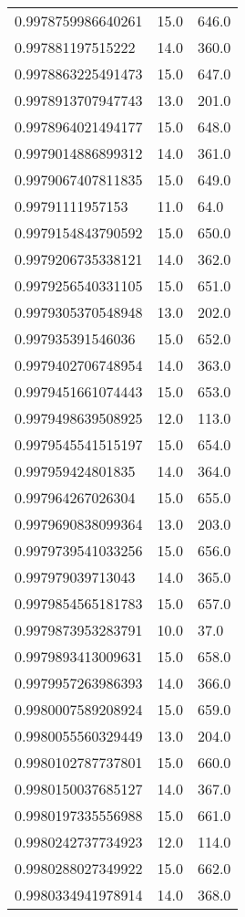 \begin{center}
\begin{supertabular}[H]{p{0.30\textwidth}p{0.05\textwidth}p{0.05\textwidth}}
0.9978759986640261 & 15.0 & 646.0 \\ 
0.997881197515222 & 14.0 & 360.0 \\ 
0.9978863225491473 & 15.0 & 647.0 \\ 
0.9978913707947743 & 13.0 & 201.0 \\ 
0.9978964021494177 & 15.0 & 648.0 \\ 
0.9979014886899312 & 14.0 & 361.0 \\ 
0.9979067407811835 & 15.0 & 649.0 \\ 
0.99791111957153 & 11.0 & 64.0 \\ 
0.9979154843790592 & 15.0 & 650.0 \\ 
0.9979206735338121 & 14.0 & 362.0 \\ 
0.9979256540331105 & 15.0 & 651.0 \\ 
0.9979305370548948 & 13.0 & 202.0 \\ 
0.997935391546036 & 15.0 & 652.0 \\ 
0.9979402706748954 & 14.0 & 363.0 \\ 
0.9979451661074443 & 15.0 & 653.0 \\ 
0.9979498639508925 & 12.0 & 113.0 \\ 
0.9979545541515197 & 15.0 & 654.0 \\ 
0.997959424801835 & 14.0 & 364.0 \\ 
0.997964267026304 & 15.0 & 655.0 \\ 
0.9979690838099364 & 13.0 & 203.0 \\ 
0.9979739541033256 & 15.0 & 656.0 \\ 
0.997979039713043 & 14.0 & 365.0 \\ 
0.9979854565181783 & 15.0 & 657.0 \\ 
0.9979873953283791 & 10.0 & 37.0 \\ 
0.9979893413009631 & 15.0 & 658.0 \\ 
0.9979957263986393 & 14.0 & 366.0 \\ 
0.9980007589208924 & 15.0 & 659.0 \\ 
0.9980055560329449 & 13.0 & 204.0 \\ 
0.9980102787737801 & 15.0 & 660.0 \\ 
0.9980150037685127 & 14.0 & 367.0 \\ 
0.9980197335556988 & 15.0 & 661.0 \\ 
0.9980242737734923 & 12.0 & 114.0 \\ 
0.9980288027349922 & 15.0 & 662.0 \\ 
0.9980334941978914 & 14.0 & 368.0 \\ 

\end{supertabular}
\end{center}
